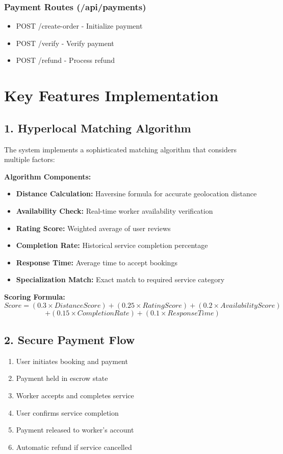 \documentclass[12pt,a4paper]{article}
\begin{document}
\subsubsection*{Payment Routes (/api/payments)}
\begin{itemize}[leftmargin=*]
    \item POST /create-order - Initialize payment
    \item POST /verify - Verify payment
    \item POST /refund - Process refund
\end{itemize}

\newpage

\section*{Key Features Implementation}

\subsection*{1. Hyperlocal Matching Algorithm}
The system implements a sophisticated matching algorithm that considers multiple factors:

\textbf{Algorithm Components:}
\begin{itemize}[leftmargin=*]
    \item \textbf{Distance Calculation:} Haversine formula for accurate geolocation distance
    \item \textbf{Availability Check:} Real-time worker availability verification
    \item \textbf{Rating Score:} Weighted average of user reviews
    \item \textbf{Completion Rate:} Historical service completion percentage
    \item \textbf{Response Time:} Average time to accept bookings
    \item \textbf{Specialization Match:} Exact match to required service category
\end{itemize}

\textbf{Scoring Formula:}
$$Score = (0.3 \times DistanceScore) + (0.25 \times RatingScore) + (0.2 \times AvailabilityScore)$$
$$+ (0.15 \times CompletionRate) + (0.1 \times ResponseTime)$$

\subsection*{2. Secure Payment Flow}
\begin{enumerate}[leftmargin=*]
    \item User initiates booking and payment
    \item Payment held in escrow state
    \item Worker accepts and completes service
    \item User confirms service completion
    \item Payment released to worker's account
    \item Automatic refund if service cancelled
\end{enumerate}
\end{document}
